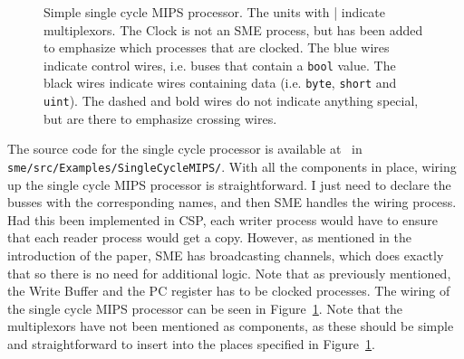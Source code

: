 \begin{figure}
{
    }
    \caption{Simple single cycle MIPS processor. The units with | indicate
    multiplexors. The Clock is not an SME process, but has been added to
    emphasize which processes that are clocked. The blue wires indicate control
    wires, i.e. buses that contain a \texttt{bool} value. The black wires
    indicate wires containing data (i.e. \texttt{byte}, \texttt{short} and
    \texttt{uint}). The dashed and bold wires do not indicate anything
    special, but are there to emphasize crossing wires.}
    \label{fig:simple-full}
\end{figure}
The source code for the single cycle processor is available
at~\cite{ref:github} in \texttt{sme/src/Examples/SingleCycleMIPS/}.
With all the components in place, wiring up the single cycle MIPS processor is
straightforward. I just need to declare the busses with the corresponding
names, and then SME handles the wiring process. Had this been implemented in
CSP, each writer process would have to ensure that each reader process would
get a copy. However, as mentioned in the introduction of the paper, SME has
broadcasting channels, which does exactly that so there is no need for
additional logic. Note that as previously mentioned, the Write Buffer and the
PC register has to be clocked processes. The wiring of the single cycle MIPS
processor can be seen in Figure~\ref{fig:simple-full}. Note that the
multiplexors have not been mentioned as components, as these should be simple
and straightforward to insert into the places specified in
Figure~\ref{fig:simple-full}.

